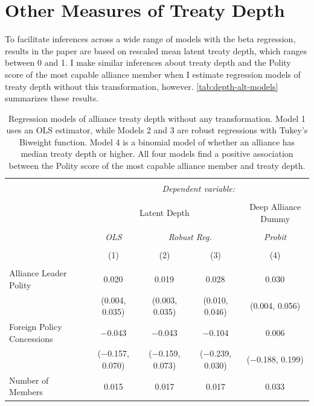 \documentclass[12pt]{article}
\begin{document}
\section{Other Measures of Treaty Depth}


To facilitate inferences across a wide range of models with the beta regression, results in the paper are based on rescaled mean latent treaty depth, which ranges between 0 and 1. 
I make similar inferences about treaty depth and the Polity score of the most capable alliance member when I estimate regression models of treaty depth without this transformation, however. 
\autoref{tab:depth-alt-models} summarizes these results. 

\begin{table}[!htbp] 
\centering 
  \caption{Regression models of alliance treaty depth without any transformation. Model 1 uses an OLS estimator, while Models 2 and 3 are robust regressions with Tukey's Biweight function. Model 4 is a binomial model of whether an alliance has median treaty depth or higher. All four models find a positive association between the Polity score of the most capable alliance member and treaty depth.} 
  \label{tab:depth-alt-models} 
\begin{adjustbox}{width= .95\textwidth, center}
\begin{tabular}{@{\extracolsep{5pt}}lcccc} 
\\[-1.8ex]\hline 
\hline \\[-1.8ex] 
 & \multicolumn{4}{c}{\textit{Dependent variable:}} \\ 
\cline{2-5} 
\\[-1.8ex] & \multicolumn{3}{c}{Latent Depth} & Deep Alliance Dummy \\ 
\\[-1.8ex] & \textit{OLS} & \multicolumn{2}{c}{\textit{Robust Reg.}} & \textit{Probit} \\ 
\\[-1.8ex] & (1) & (2) & (3) & (4)\\ 
\hline \\[-1.8ex] 
 Alliance Leader Polity & 0.020$^{}$ & 0.019$^{}$ & 0.028$^{}$ & 0.030$^{}$ \\ 
  & (0.004, 0.035) & (0.003, 0.035) & (0.010, 0.046) & (0.004, 0.056) \\ 
  Foreign Policy Concessions & $-$0.043 & $-$0.043 & $-$0.104 & 0.006 \\ 
  & ($-$0.157, 0.070) & ($-$0.159, 0.073) & ($-$0.239, 0.030) & ($-$0.188, 0.199) \\ 
  Number of Members & 0.015 & 0.017 & 0.017 & 0.033$^{}$ \\ 

\end{tabular}
\end{adjustbox}
\end{table}
\end{document}
